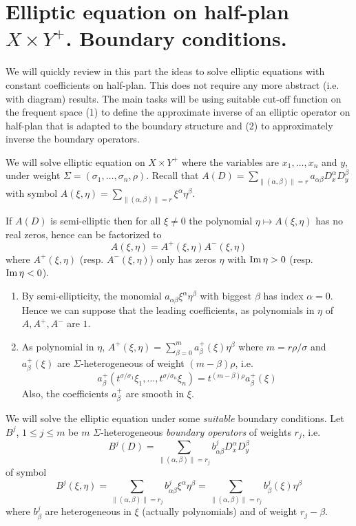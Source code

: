 \section{Elliptic equation on half-plan \(X\times Y^+\). Boundary conditions. \label{ell-half-plan}}
\label{sec:org0deb1e7}
We will quickly review in this part the ideas to solve elliptic equations with constant
coefficients on half-plan. This does not require any more abstract (i.e. with diagram)
results. The main tasks will be using suitable cut-off function on the frequent space (1)
to define the approximate inverse of an elliptic operator on half-plan that is adapted to
the boundary structure and (2) to approximately inverse the boundary operators.

We will solve elliptic equation on \(X\times Y^+\) where the variables are \(x_1,\dots,
x_n\) and \(y\), under weight \(\Sigma = (\sigma_1,\dots, \sigma_n,\rho)\). Recall
that \(A(D) = \sum_{\|(\alpha,\beta)\|=r}a_{\alpha \beta}D^\alpha_x D^\beta_y\) with
symbol \(A(\xi,\eta)=\sum_{\|(\alpha,\beta)\|=r}\xi^\alpha\eta^\beta\).

If \(A(D)\) is semi-elliptic then for all \(\xi \ne 0\) the polynomial \(\eta \mapsto
A(\xi,\eta)\) has no real zeros, hence can be factorized to
\[
 A(\xi,\eta)=A^+(\xi,\eta)A^-(\xi,\eta)
\]
where \(A^+(\xi,\eta)\) (resp. \(A^-(\xi,\eta)\)) only has zeros \(\eta\) with \(\mathop{\rm Im}\nolimits\eta >0\) (resp. \(\mathop{\rm Im}\nolimits \eta <0\)).

\begin{remark}
\begin{enumerate}
\item By semi-ellipticity, the monomial \(a_{\alpha\beta}\xi^\alpha \eta^\beta\) with biggest \(\beta\) has
index \(\alpha = 0\). Hence we can suppose that the leading coefficients, as
polynomials in \(\eta\) of \(A, A^+, A^-\) are \(1\).
\item As polynomial in \(\eta\), \(A^+(\xi,\eta)=\sum_{\beta=0}^m a^+_\beta(\xi)\eta^\beta\) where \(m=r\rho/\sigma\) and \(a^+_\beta(\xi)\) are \(\Sigma\)-heterogeneous
of weight \((m-\beta)\rho\), i.e. 
\[
    a^+_\beta(t^{\sigma/\sigma_1}\xi_1,\dots,t^{\sigma/\sigma_n}\xi_n) = t^{(m-\beta)\rho}a^+_\beta(\xi)
   \]
 Also, the coefficients \(a^+_\beta\) are smooth in \(\xi\).
\end{enumerate}
\end{remark}

We will solve the elliptic equation under some \emph{suitable} boundary conditions. Let \(B^j\), \(1\leq j\leq m\) be \(m\) \(\Sigma\)-heterogeneous \emph{boundary operators} of
weights \(r_j\), i.e.
\[
B^j(D) = \sum_{\|(\alpha,\beta)\| = r_j} b^j_{\alpha\beta}D^\alpha_x D^\beta_y
\]
of symbol 
\[ 
B^j(\xi,\eta) = \sum_{\|(\alpha,\beta)\| = r_j} b^j_{\alpha\beta}\xi^\alpha
\eta^\beta = \sum_{\|(\alpha,\beta)\| = r_j} b^j_{\beta}(\xi)\eta^\beta  
\]
where \(b_\beta^j\) are heterogeneous in \(\xi\) (actually polynomials) and of weight \(r_j-\beta\).


